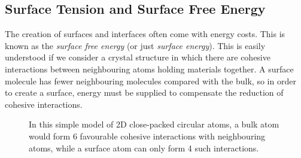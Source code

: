 \documentclass{article}
\theoremstyle{plain}\theoremheaderfont{\normalfont\itshape}\theorembodyfont{\rmfamily}\theoremseparator{.}\newtheorem*{rem}{Remark}\newtheorem*{ex}{Example}\newtheorem*{proof}{Proof}\newtheorem*{altp}{Alternative proof}
\theoremstyle{plain}\theoremheaderfont{\normalfont\bfseries}\theorembodyfont{\rmfamily}\theoremseparator{.}\newtheorem{thm}{Theorem}[section]\newtheorem{lem}[thm]{Lemma}\newtheorem{prop}[thm]{Proposition}\newtheorem*{cor}{Corollary}\newtheorem{defn}[thm]{Definition}\newtheorem{clm}[thm]{Claim}\newtheorem{clminproof}{Claim}\newtheorem*{law}{Law}\newtheorem{pos}[thm]{Postulate}
\theoremstyle{break}\theoremheaderfont{\normalfont\itshape}\theorembodyfont{\rmfamily}\theoremseparator{.\medskip}\newtheorem*{proofskip}{Proof}\newtheorem*{exs}{Examples}\newtheorem*{rems}{Remarks}
\theoremstyle{break}\theoremheaderfont{\normalfont\bfseries}\theorembodyfont{\rmfamily}\theoremseparator{.\medskip}\newtheorem{lemskip}[thm]{Lemma}\newtheorem{defnskip}[thm]{Definition}\newtheorem{propskip}[thm]{Proposition}\newtheorem{thmskip}[thm]{Theorem}
\numberwithin{equation}{section}
\begin{document}
	\subsection{Surface Tension and Surface Free Energy}
	The creation of surfaces and interfaces often come with energy costs. This is known as the \textit{surface free energy} (or just \textit{surface energy}). This is easily understood if we consider a crystal structure in which there are cohesive interactions between neighbouring atoms holding materials together. A surface molecule has fewer neighbouring molecules compared with the bulk, so in order to create a surface, energy must be supplied to compensate the reduction of cohesive interactions.

	\begin{figure}[ht!]
		\centering
		\caption{In this simple model of 2D close-packed circular atoms, a bulk atom would form 6 favourable cohesive interactions with neighbouring atoms, while a surface atom can only form 4 such interactions.}
	\end{figure}
\end{document}
